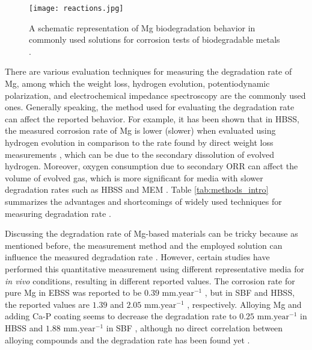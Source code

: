 \begin{figure}
\centering
\medskip
\texttt{[image: reactions.jpg]}
\caption[Mg biodegradation behavior in commonly used test solutions]{A schematic representation of Mg biodegradation behavior in commonly used solutions for corrosion tests of biodegradable metals \cite{Mei2020}.} \label{fig:reactions_intro}
\end{figure}


There are various evaluation techniques for measuring the degradation rate of Mg, among which the weight loss, hydrogen evolution, potentiodynamic polarization, and electrochemical impedance spectroscopy are the commonly used ones. Generally speaking, the method used for evaluating the degradation rate can affect the reported behavior. For example, it has been shown that in \gls{HBSS}, the measured corrosion rate of Mg is lower (slower) when evaluated using hydrogen evolution in comparison to the rate found by direct weight loss measurements \cite{Johnston2015,Johnston2019}, which can be due to the secondary dissolution of evolved hydrogen. Moreover, oxygen consumption due to secondary \gls{ORR} can affect the volume of evolved gas, which is more significant for media with slower degradation rates such as \gls{HBSS} and \gls{MEM} \cite{Wang2020}. Table \ref{tab:methods_intro} summarizes the advantages and shortcomings of widely used techniques for measuring degradation rate \cite{Mei2020}. 

Discussing the degradation rate of Mg-based materials can be tricky because as mentioned before, the measurement method and the employed solution can influence the measured degradation rate \cite{Pogorielov2017}. However, certain studies have performed this quantitative measurement using different representative media for \textit{in vivo} conditions, resulting in different reported values. The corrosion rate for pure Mg in \gls{EBSS} was reported to be $0.39 \text{ mm.year}^{-1}$ \cite{Walker2012}, but in \gls{SBF} and \gls{HBSS}, the reported values are $1.39$ \cite{Gu2009} and $2.05 \text{ mm.year}^{-1}$ \cite{Abidin2013}, respectively. Alloying Mg and adding Ca-P coating seems to decrease the degradation rate to $0.25 \text{ mm.year}^{-1}$ in \gls{HBSS} \cite{Wang2011} and $1.88 \text{ mm.year}^{-1}$ in \gls{SBF} \cite{Barfield2012}, although no direct correlation between alloying compounds and the degradation rate has been found yet \cite{Sanchez2015}.

